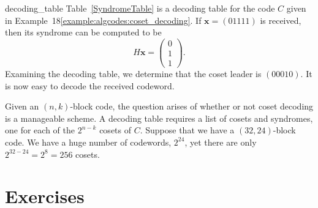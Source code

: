  
\begin{example}{decoding_table}
Table~\ref{SyndromeTable} is a decoding table for the code $C$ given in Example~18\ref{example:algcodes:coset_decoding}. %
If ${\mathbf x} = (01111)$ is received, then its syndrome can be computed to be
\[
H {\mathbf x} =
\begin{pmatrix}
0 \\ 1 \\ 1
\end{pmatrix}.
\]
Examining the decoding table, we determine that the coset leader is
$(00010)$. It is now easy to decode the received codeword. 
\end{example}
 
 
Given an $(n,k)$-block code, the question arises of whether or not
coset decoding is a manageable scheme.  A decoding table requires a
list of cosets and syndromes, one for each of the $2^{n-k}$ cosets of
$C$.  Suppose that we have a $(32, 24)$-block code.  We have a huge
number of codewords, $2^{24}$, yet there are only $2^{32-24} = 2^{8} =
256$ cosets.  
 

 
 
 
 
\section*{Exercises}
\exrule
 
 
 
